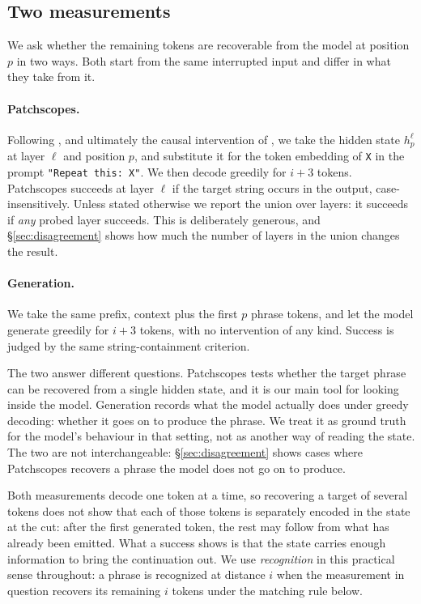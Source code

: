 \subsection{Two measurements}
\label{sec:measures}

We ask whether the remaining tokens are recoverable from the model at position
$p$ in two ways. Both start from the same interrupted input and differ in what
they take from it.

\paragraph{Patchscopes.}
Following \citet{ghandeharioun-etal-2024-patchscopes}, and ultimately the causal
intervention of \citet{pal-etal-2023-future}, we take the hidden state
$h^{\ell}_p$ at layer $\ell$ and position $p$, and substitute it for the token
embedding of \texttt{X} in the prompt \texttt{"Repeat this: X"}. We then decode
greedily for $i+3$ tokens. Patchscopes succeeds at layer $\ell$ if the target
string occurs in the output, case-insensitively. Unless stated otherwise we
report the union over layers: it succeeds if \emph{any} probed layer
succeeds. This is deliberately generous, and \S\ref{sec:disagreement} shows how
much the number of layers in the union changes the result.

\paragraph{Generation.}
We take the same prefix, context plus the first $p$ phrase tokens, and let
the model generate greedily for $i+3$ tokens, with no intervention of any kind.
Success is judged by the same string-containment criterion.

The two answer different questions. Patchscopes tests whether the target phrase
can be recovered from a single hidden state, and it is our main tool for
looking inside the model. Generation records what the model actually does under
greedy decoding: whether it goes on to produce the phrase. We treat it as
ground truth for the model's behaviour in that setting, not as another way of
reading the state. The two are not interchangeable: \S\ref{sec:disagreement}
shows cases where Patchscopes recovers a phrase the model does not go on to
produce.

Both measurements decode one token at a time, so recovering a target of several
tokens does not show that each of those tokens is separately encoded in the
state at the cut: after the first generated token, the rest may follow from
what has already been emitted. What a success shows is that the state carries
enough information to bring the continuation out. We use \emph{recognition} in
this practical sense throughout: a phrase is recognized at distance $i$ when
the measurement in question recovers its remaining $i$ tokens under the
matching rule below.

